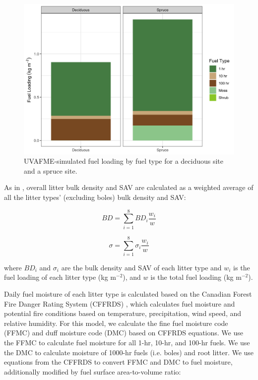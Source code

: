 \documentclass[a4paper, 12pt] {report}
\begin{document}
\begin{figure}
	\includegraphics[width=1\linewidth]{Figures/fuel_loading.png}
	\caption{UVAFME-simulated fuel loading by fuel type for a deciduous site and a spruce site.}
	\label{fig:fueltypes}
\end{figure}

As in , overall litter bulk density and SAV are calculated as a weighted average of all the litter types' (excluding boles) bulk density and SAV:

\begin{equation} 
	BD = \sum_{i=1}^{8} BD_i\frac{w_i}{w}
\end{equation}

\begin{equation} 
	\sigma = \sum_{i=1}^{8} \sigma_i\frac{w_i}{w}
\end{equation}

where $BD_i$ and $\sigma_i$ are the bulk density and SAV of each litter type and $w_i$ is the fuel loading of each litter type (kg m$^{-2}$), and $w$ is the total fuel loading (kg m$^{-2}$).

Daily fuel moisture of each litter type is calculated based on the Canadian Forest Fire Danger Rating System (CFFRDS) \cite{wangUpdatedSourceCode2015}, which calculates fuel moisture and potential fire conditions based on temperature, precipitation, wind speed, and relative humidity. For this model, we calculate the fine fuel moisture code (FFMC) and duff moisture code (DMC) based on CFFRDS equations. We use the FFMC to calculate fuel moisture for all 1-hr, 10-hr, and 100-hr fuels. We use the DMC to calculate moisture of 1000-hr fuels (i.e. boles) and root litter.  We use equations from the CFFRDS to convert FFMC and DMC to fuel moisture, additionally modified by fuel surface area-to-volume ratio:
\end{document}
